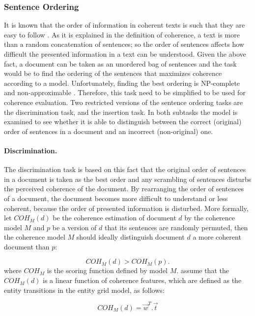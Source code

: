 \subsubsection{Sentence Ordering}
It is known that the order of information in coherent texts is such that they are easy to follow \cite{lapata03,barzilay04,karamanis04b,barzilay05a,soricut06}. 
As it is explained in the definition of coherence, a text is more than a random concatenation of sentences; so the order of sentences affects how difficult the presented information in a text can be understood.  
Given the above fact, a document can be taken as an unordered bag of sentences and the task would be to find the ordering of the sentences that maximizes coherence according to a model. 
Unfortunately, finding the best ordering is NP-complete \cite{?} and non-approximable \cite{althaus04}.
Therefore, this task need to be simplified to be used for coherence evaluation. 
Two restricted versions of the sentence ordering tasks are the discrimination task, and the insertion task. 
In both subtasks the model is examined to see whether it is able to distinguish between the correct (original) order of sentences in a document and an incorrect (non-original) one. 

\paragraph{Discrimination.}
The discrimination task is based on this fact that the original order of sentences in a document is taken as the best order and any scrambling of sentences disturbs the perceived coherence of the document. 
By rearranging the order of sentences of a document, the document becomes more difficult to understand or less coherent, because the order of presented information is disturbed. 
More formally, let $COH_M(d)$ be the coherence estimation of document $d$ by the coherence model $M$ and $p$ be a version of $d$ that its sentences are randomly permuted, then the coherence model $M$ should ideally distinguish document $d$ a more coherent document than $p$:

\begin{equation}
COH_M(d) > COH_M(p). 
\end{equation}
where $COH_M$ is the scoring function defined by model $M$. 
 assume that the $COH_M(d)$ is a linear function of coherence features, which are defined as the entity transitions in the entity grid model, as follows:

\begin{equation}
COH_M(d) = \vec{w}^{T}.\vec{t}
\end{equation}

